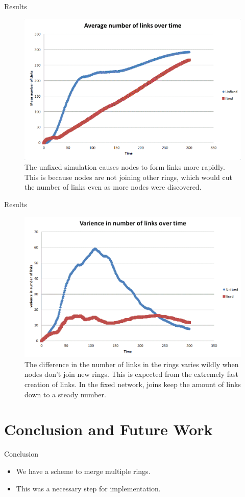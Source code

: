 \documentclass{beamer}
\begin{document}
\begin{frame}{Results}
\begin{figure}
	\includegraphics[scale=0.2]{chart1}
	\caption{The unfixed simulation causes nodes to form links more rapidly.  This is because nodes are not joining other rings, which would cut the number of links even as more nodes were discovered.}
	\label{chart1}
\end{figure}

\end{frame}


\begin{frame}{Results}

\begin{figure}
	\includegraphics[width=0.7\linewidth]{chart2}
	\caption{The difference in the number of links in the rings varies wildly when nodes don't join new rings. This is expected from the extremely fast creation of links.  In the fixed network, joins keep the amount of links down to a steady number. }
	\label{chart2}
\end{figure}

\end{frame}

\section{Conclusion and Future Work}

\begin{frame}{Conclusion}
	\begin{itemize}
		\item We have a scheme to merge multiple rings.
		\item This was a necessary step for implementation.
	\end{itemize}
\end{frame}
\end{document}
